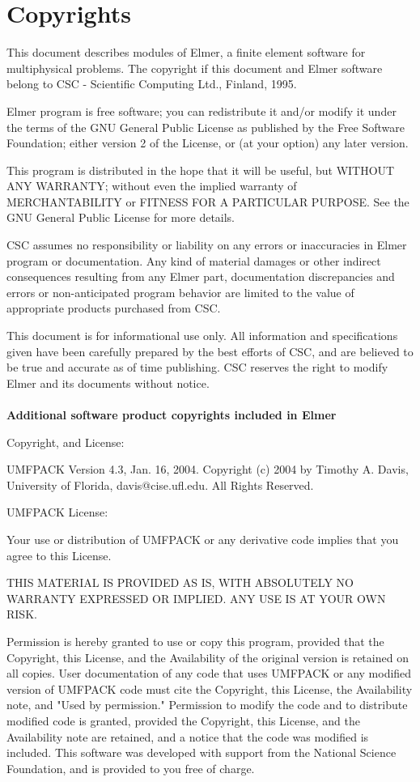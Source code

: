\chapter*{Copyrights}

This document describes modules of Elmer,
a finite element software for multiphysical problems.
The copyright if this document and Elmer software belong to
CSC - Scientific Computing Ltd., Finland, 1995. 

Elmer program is free software; you can redistribute it and/or
modify it under the terms of the GNU General Public License
as published by the Free Software Foundation; either version 2
of the License, or (at your option) any later version.

This program is distributed in the hope that it will be useful,
but WITHOUT ANY WARRANTY; without even the implied warranty of
MERCHANTABILITY or FITNESS FOR A PARTICULAR PURPOSE.  See the
GNU General Public License for more details.

CSC assumes no responsibility or liability on any errors or inaccuracies in 
Elmer program or documentation. Any kind of material damages or other indirect
consequences resulting from any Elmer part, documentation discrepancies and 
errors or non-anticipated program behavior are limited to the value of 
appropriate products purchased from CSC. 

This document is for informational use only. All information and specifications
given have been carefully prepared by the best efforts of CSC, and are believed
to be true and accurate as of time publishing. CSC reserves the right to 
modify Elmer and its documents without notice. \\  \mbox{} \\

\textbf{Additional software product copyrights included in Elmer}

Copyright, and License:

UMFPACK Version 4.3, Jan. 16, 2004. Copyright (c) 2004 by Timothy
A. Davis, University of Florida, davis@cise.ufl.edu. All Rights
Reserved. 


UMFPACK License: 

Your use or distribution of UMFPACK or any derivative code implies
that you agree to this License. 

      THIS MATERIAL IS PROVIDED AS IS, WITH ABSOLUTELY NO WARRANTY
      EXPRESSED OR IMPLIED. ANY USE IS AT YOUR OWN RISK. 

      Permission is hereby granted to use or copy this program,
      provided that the Copyright, this License, and the Availability
      of the original version is retained on all copies. User
      documentation of any code that uses UMFPACK or any modified
      version of UMFPACK code must cite the Copyright, this License,
      the Availability note, and "Used by permission." Permission to
      modify the code and to distribute modified code is granted,
      provided the Copyright, this License, and the Availability note
      are retained, and a notice that the code was modified is
      included. This software was developed with support from the
      National Science Foundation, and is provided to you free of
      charge. 

